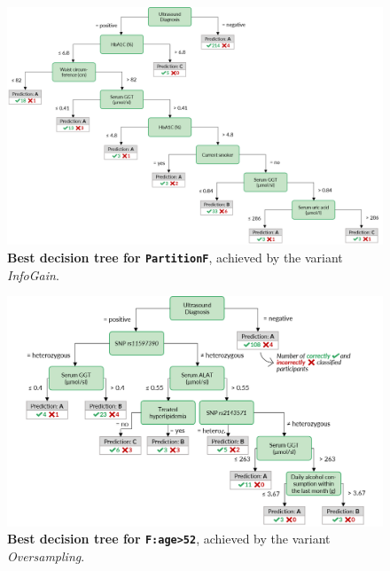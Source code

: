 \documentclass[
  oneside]{book}
\begin{document}
\begin{figure}[htbp]

{\centering \includegraphics[width=1\linewidth]{figures/03-tree-women} 

}

\caption{\textbf{Best decision tree for \texttt{PartitionF}}, achieved by the variant \emph{InfoGain}.}\label{fig:03-tree-women}
\end{figure}



\begin{figure}[htbp]

{\centering \includegraphics[width=1\linewidth]{figures/03-tree-menopause} 

}

\caption{\textbf{Best decision tree for \texttt{F:age\textgreater{}52}}, achieved by the variant \emph{Oversampling}.}\label{fig:03-tree-menopause}
\end{figure}
\end{document}
